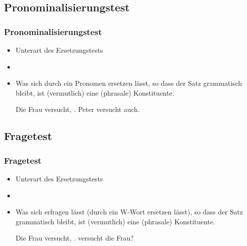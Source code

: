 \subsection{Pronominalisierungstest}

\begin{frame}
\frametitle{Pronominalisierungstest}

\begin{itemize}
	\item Unterart des Ersetzungstests
	\item[]
	\item Was sich durch ein Pronomen ersetzen lässt, so dass der Satz grammatisch bleibt, ist (vermutlich) eine (phrasale) Konstituente.

	\eal 
	\zl

\pause	
	\eal 
	\ex Die Frau versucht, .
	\ex Peter versucht \alertred{[das]} auch.
	\zl
	
\end{itemize}

\end{frame}


\subsection{Fragetest}

\begin{frame}
\frametitle{Fragetest}

\begin{itemize}
	\item Unterart des Ersetzungstests
	\item[]
	\item Was sich erfragen lässt (durch ein W-Wort ersetzen lässt), so dass der Satz grammatisch bleibt, ist (vermutlich) eine (phrasale) Konstituente.

	\eal 
	\zl

\pause	
	\eal 
	\ex Die Frau versucht, .
	\ex \alertred{[Was]} versucht die Frau?
	\zl
	
\end{itemize}

\end{frame}



